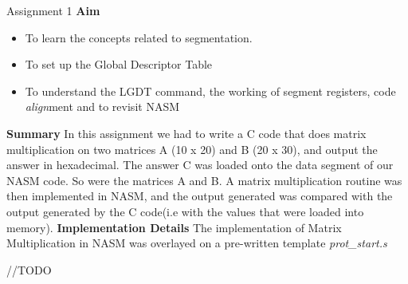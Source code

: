 \documentclass[a4paper,12pt]{report}
\begin{document}
\begin{section}{Assignment 1}
  \textbf {Aim }

\begin{itemize}
 \item To learn the concepts related to segmentation.
\item To set up the Global Descriptor Table
\item To understand the LGDT command, the working of segment registers, code \textit{align}ment and to revisit NASM
\end{itemize}
  \textbf {Summary} \newline
In this assignment we had to write a C code that does matrix multiplication on two matrices A (10 x 20) and B (20 x 30),
and output the answer in hexadecimal. The answer C was loaded onto the data segment of our NASM code. So were the matrices A and B. 
A matrix multiplication routine was then implemented in NASM, and the output generated was compared with the output generated by 
the C code(i.e with the values that were loaded into memory). \newline\newline
  \textbf {Implementation Details} \newline
The implementation of Matrix Multiplication in NASM was overlayed on a pre-written template \textit{prot\_start.s}

//TODO
\end{section}
\end{document}
